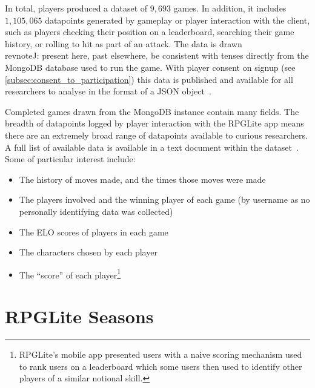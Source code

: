 In total, players produced a dataset of $9,693$ games. In addition, it includes
$1,105,065$ datapoints generated by gameplay or player interaction with the
client, such as players checking their position on a leaderboard, searching
their game history, or rolling to hit as part of an attack. The data is
drawn\\revnote{J: present here, past elsewhere, be consistent with tenses}
directly from the MongoDB database used to run the game. With player consent on
signup (see \cref{subsec:consent_to_participation}) this data is published and
available for all researchers to analyse in the format of a JSON
object~\cite{rpglite_dataset}.

Completed games drawn from the MongoDB instance contain many fields. The breadth
of datapoints logged by player interaction with the RPGLite app means there are
an extremely broad range of datapoints available to curious
researchers. A full
list of available data is available in a text document within the
dataset~\cite{rpglite_dataset}. Some of particular interest include:

\begin{itemize}
    \item The history of moves made, and the times those moves were
made
\item The players involved and the winning player of each game (by username as
no personally identifying data was collected)
\item The ELO scores of players in each game
\item The characters chosen by each player
\item The ``score'' of each player\footnote{RPGLite's mobile app presented users
with a naive scoring mechanism used to rank users on a leaderboard which some
users then used to identify other players of a similar notional skill.}
\end{itemize}



\section{RPGLite Seasons}
\label{seasons_of_rpglite}

